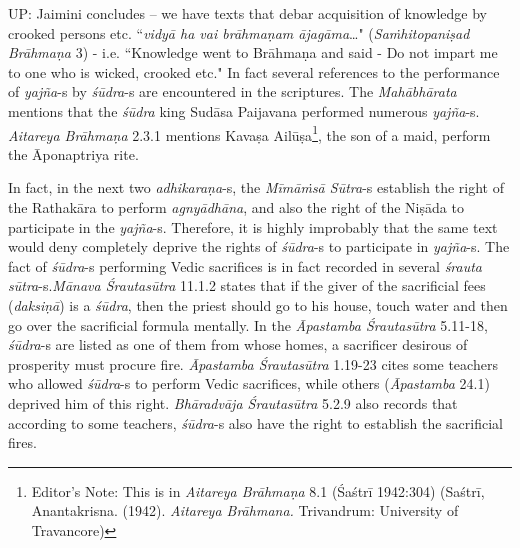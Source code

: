 UP: Jaimini concludes – we have texts that debar acquisition of knowledge by crooked persons etc. ``\textit{vidyā ha vai brāhmaṇam ājagāma}…" (\textit{Saṁhitopaniṣad Brāhmaṇa} 3) - i.e. ``Knowledge went to Brāhmaṇa and said - Do not impart me to one who is wicked, crooked etc." In fact several references to the performance of \textit{yajña}-s by \textit{śūdra}-s are encountered in the scriptures. The \textit{Mahābhārata} mentions that the \textit{śūdra} king Sudāsa Paijavana performed numerous \textit{yajña}-s. \textit{Aitareya Brāhmaṇa} 2.3.1 mentions Kavaṣa Ailūṣa\footnote{Editor's Note: This is in \textit{Aitareya Brāhmaṇa} 8.1 (Śaśtrī 1942:304) (Saśtrī, Anantakrisna. (1942). \textit{Aitareya Brāhmana.} Trivandrum: University of Travancore)}, the son of a maid, perform the Āponaptriya rite.

In fact, in the next two \textit{adhikaraṇa}-s, the \textit{Mīmāṁsā Sūtra}-s establish the right of the Rathakāra to perform \textit{agnyādhāna}, and also the right of the Niṣāda to participate in the \textit{yajña}-s. Therefore, it is highly improbably that the same text would deny completely deprive the rights of \textit{śūdra}-s to participate in \textit{yajña}-s. The fact of \textit{śūdra}-s performing Vedic sacrifices is in fact recorded in several \textit{śrauta sūtra}-s.\break \textit{Mānava Śrautasūtra} 11.1.2 states that if the giver of the sacrificial fees (\textit{daksiṇā}) is a \textit{śūdra}, then the priest should go to his house, touch water and then go over the sacrificial formula mentally. In the \textit{Āpastamba Śrautasūtra} 5.11-18, \textit{śūdra}-s are listed as one of them from whose homes, a sacrificer desirous of prosperity must procure fire. \textit{Āpastamba Śrautasūtra} 1.19-23 cites some teachers who allowed \textit{śūdra}-s to perform Vedic sacrifices, while others (\textit{Āpastamba} 24.1) deprived him of this right. \textit{Bhāradvāja Śrautasūtra} 5.2.9 also records that according to some teachers, \textit{śūdra}-s also have the right to establish the sacrificial fires.

